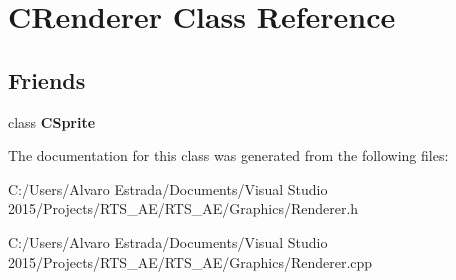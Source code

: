 \hypertarget{class_c_renderer}{}\section{C\+Renderer Class Reference}
\label{class_c_renderer}
\subsection*{Friends}
\begin{DoxyCompactItemize}
\item 
class {\bfseries C\+Sprite}\hypertarget{class_c_renderer_ae1e999dd59437b824a3d0f9b9da113bf}{}\label{class_c_renderer_ae1e999dd59437b824a3d0f9b9da113bf}

\end{DoxyCompactItemize}


The documentation for this class was generated from the following files\+:\begin{DoxyCompactItemize}
\item 
C\+:/\+Users/\+Alvaro Estrada/\+Documents/\+Visual Studio 2015/\+Projects/\+R\+T\+S\+\_\+\+A\+E/\+R\+T\+S\+\_\+\+A\+E/\+Graphics/Renderer.\+h\item 
C\+:/\+Users/\+Alvaro Estrada/\+Documents/\+Visual Studio 2015/\+Projects/\+R\+T\+S\+\_\+\+A\+E/\+R\+T\+S\+\_\+\+A\+E/\+Graphics/Renderer.\+cpp\end{DoxyCompactItemize}
